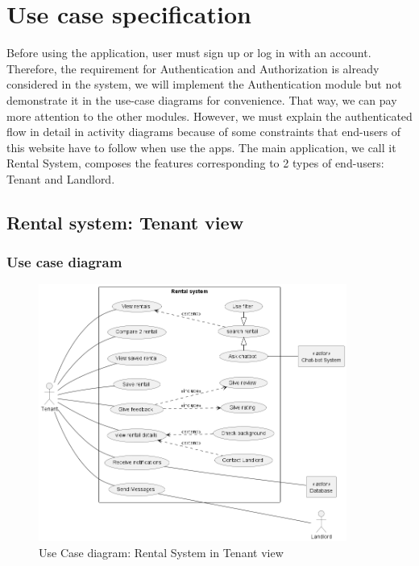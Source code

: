 \section{Use case specification}
Before using the application, user must sign up or log in with an account. Therefore, the requirement for Authentication and Authorization is already considered in the system, we will implement the Authentication module but not demonstrate it in the use-case diagrams for convenience. That way, we can pay more attention to the other modules. However, we must explain the authenticated flow in detail in activity diagrams because of some constraints that end-users of this website have to follow when use the apps. The main application, we call it Rental System, composes the features corresponding to 2 types of end-users: Tenant and Landlord. 

\subsection{Rental system: Tenant view}
\subsubsection{Use case diagram}
\begin{figure}[H]
    \centering
    \includegraphics[width = 0.9\textwidth]{Images/rental_system_tenant.png}
    \caption{Use Case diagram: Rental System in Tenant view}
    \label{fig:enter-label}
\end{figure}

